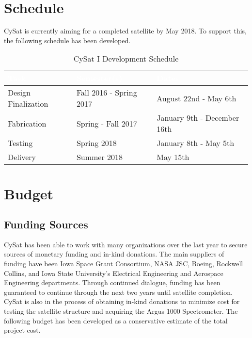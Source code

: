 \documentclass[nocover]            %
{CSLI}                       %
\begin{document}
\section{Schedule}
CySat is currently aiming for a completed satellite by May 2018. To support this, the following schedule has been developed.
\begin{table}[H]
\centering
\caption{CySat I Development Schedule}
\begin{tabular}{| l | l | l |}
\arrayrulecolor{white}
\hline
\rowcolor{gray!80}
\textcolor{white}{\textbf{Task}} & \textcolor{white}{\textbf{Semester(s)}} & \textcolor{white}{\textbf{Dates}} \\ \hline
\rowcolor{gray!10}
Design Finalization & Fall 2016 - Spring 2017& August 22nd - May 6th  \\ \hline
\rowcolor{gray!5}
Fabrication & Spring - Fall 2017 & January 9th - December 16th  \\ \hline
\rowcolor{gray!10}
Testing & Spring 2018 & January 8th - May 5th   \\ \hline
\rowcolor{gray!5}
Delivery & Summer 2018 & May 15th \\ \hline
\end{tabular}
\end{table}

\section{Budget}
\subsection{Funding Sources}
CySat has been able to work with many organizations over the last year to secure sources of monetary funding and in-kind donations. The main suppliers of funding have been Iowa Space Grant Consortium, NASA JSC, Boeing, Rockwell Collins, and Iowa State University's Electrical Engineering and Aerospace Engineering departments. Through continued dialogue, funding has been guaranteed to continue through the next two years until satellite completion. CySat is also in the process of obtaining in-kind donations to minimize cost for testing the satellite structure and acquiring the Argus 1000 Spectrometer. The following budget has been developed as a conservative estimate of the total project cost.
\end{document}
